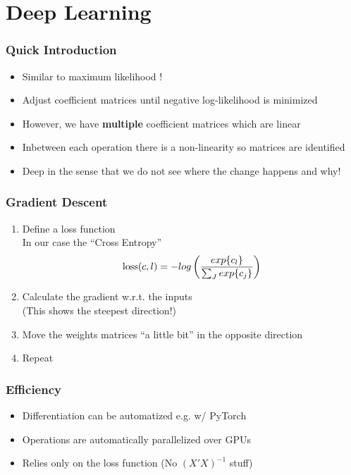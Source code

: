 \documentclass{beamer}
\begin{document}
\section{Deep Learning}
\frame{\sectionpage}
\begin{frame}
  \frametitle{Quick Introduction}
  \begin{itemize}
  \item Similar to maximum likelihood \citep[pp. 128f.]{goodfellow2016deep}!
  \item Adjust coefficient matrices until negative log-likelihood is minimized
  \item However, we have \textbf{multiple} coefficient matrices which are linear 
  \item Inbetween each operation there is a non-linearity so matrices are identified 
  \item Deep in the sense that we do not see where the change happens and why!
  \end{itemize}
\end{frame}

\begin{frame}
  \frametitle{Gradient Descent}
  \begin{enumerate}
  \item Define a loss function \\
    In our case the ``Cross Entropy'' 
    \begin{equation}
      \text{loss}(c, l) = -log\left({exp\{c_l\} \over \sum_J exp\{c_j\}}\right)
    \end{equation}
    
  \item Calculate the gradient w.r.t. the inputs \\ (This shows the steepest direction!)
  \item Move the weights matrices ``a little bit'' in the opposite direction
  \item Repeat
  \end{enumerate}
\end{frame}

\begin{frame}
  \frametitle{Efficiency}
  \begin{itemize}
  \item Differentiation can be automatized e.g. w/ PyTorch
  \item Operations are automatically parallelized over GPUs
  \item Relies only on the loss function (No $(X'X)^{-1}$ stuff)
  \end{itemize}
\end{frame}
\end{document}
